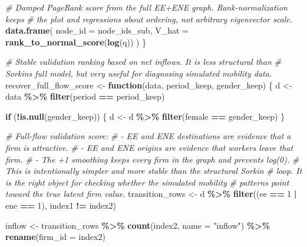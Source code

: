\documentclass[
]{article}
\newenvironment{Shaded}{\begin{snugshade}}{\end{snugshade}}
\newcommand{\AttributeTok}[1]{\textcolor[rgb]{0.13,0.29,0.53}{#1}}
\newcommand{\CommentTok}[1]{\textcolor[rgb]{0.56,0.35,0.01}{\textit{#1}}}
\newcommand{\ControlFlowTok}[1]{\textcolor[rgb]{0.13,0.29,0.53}{\textbf{#1}}}
\newcommand{\DecValTok}[1]{\textcolor[rgb]{0.00,0.00,0.81}{#1}}
\newcommand{\FunctionTok}[1]{\textcolor[rgb]{0.13,0.29,0.53}{\textbf{#1}}}
\newcommand{\NormalTok}[1]{#1}
\newcommand{\OtherTok}[1]{\textcolor[rgb]{0.56,0.35,0.01}{#1}}
\newcommand{\SpecialCharTok}[1]{\textcolor[rgb]{0.81,0.36,0.00}{\textbf{#1}}}
\newcommand{\StringTok}[1]{\textcolor[rgb]{0.31,0.60,0.02}{#1}}
\begin{document}
\begin{Shaded}
\begin{Highlighting}[]
    \CommentTok{\# Damped PageRank score from the full EE+ENE graph. Rank{-}normalization keeps}
    \CommentTok{\# the plot and regressions about ordering, not arbitrary eigenvector scale.}
    \FunctionTok{data.frame}\NormalTok{(}
        \AttributeTok{node\_id =}\NormalTok{ node\_ids\_sub,}
        \AttributeTok{V\_hat =} \FunctionTok{rank\_to\_normal\_score}\NormalTok{(}\FunctionTok{log}\NormalTok{(q))}
\NormalTok{    )}
\NormalTok{\}}

\CommentTok{\# Stable validation ranking based on net inflows. It is less structural than}
\CommentTok{\# Sorkin\textquotesingle{}s full model, but very useful for diagnosing simulated mobility data.}
\NormalTok{recover\_full\_flow\_score }\OtherTok{\textless{}{-}} \ControlFlowTok{function}\NormalTok{(data, period\_keep, gender\_keep) \{}
\NormalTok{    d }\OtherTok{\textless{}{-}}\NormalTok{ data }\SpecialCharTok{\%\textgreater{}\%}
        \FunctionTok{filter}\NormalTok{(period }\SpecialCharTok{==}\NormalTok{ period\_keep)}

    \ControlFlowTok{if}\NormalTok{ (}\SpecialCharTok{!}\FunctionTok{is.null}\NormalTok{(gender\_keep)) \{}
\NormalTok{        d }\OtherTok{\textless{}{-}}\NormalTok{ d }\SpecialCharTok{\%\textgreater{}\%} \FunctionTok{filter}\NormalTok{(female }\SpecialCharTok{==}\NormalTok{ gender\_keep)}
\NormalTok{    \}}

    \CommentTok{\# Full{-}flow validation score:}
    \CommentTok{\# {-} EE and ENE destinations are evidence that a firm is attractive.}
    \CommentTok{\# {-} EE and ENE origins are evidence that workers leave that firm.}
    \CommentTok{\# {-} The +1 smoothing keeps every firm in the graph and prevents log(0).}
    \CommentTok{\# This is intentionally simpler and more stable than the structural Sorkin}
    \CommentTok{\# loop. It is the right object for checking whether the simulated mobility}
    \CommentTok{\# patterns point toward the true latent firm value.}
\NormalTok{    transition\_rows }\OtherTok{\textless{}{-}}\NormalTok{ d }\SpecialCharTok{\%\textgreater{}\%}
        \FunctionTok{filter}\NormalTok{((ee }\SpecialCharTok{==} \DecValTok{1} \SpecialCharTok{|}\NormalTok{ ene }\SpecialCharTok{==} \DecValTok{1}\NormalTok{), index1 }\SpecialCharTok{!=}\NormalTok{ index2)}

\NormalTok{    inflow }\OtherTok{\textless{}{-}}\NormalTok{ transition\_rows }\SpecialCharTok{\%\textgreater{}\%}
        \FunctionTok{count}\NormalTok{(index2, }\AttributeTok{name =} \StringTok{"inflow"}\NormalTok{) }\SpecialCharTok{\%\textgreater{}\%}
        \FunctionTok{rename}\NormalTok{(}\AttributeTok{firm\_id =}\NormalTok{ index2)}


\end{Highlighting}
\end{Shaded}
\end{document}

